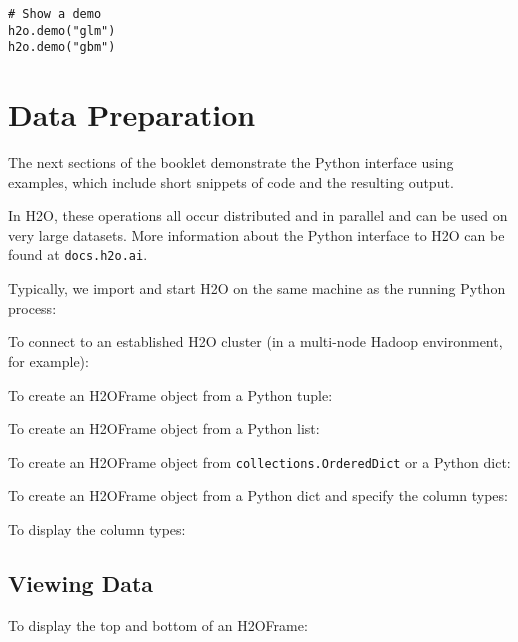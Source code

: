 {\begin{lstlisting}[style=python]
# Show a demo
h2o.demo("glm")
h2o.demo("gbm")
\end{lstlisting}


\section{Data Preparation}
The next sections of the booklet demonstrate the Python interface using examples, which include  short snippets of code and the
resulting output.  

In H2O, these operations all occur distributed and in
parallel and can be used on very large datasets.  More information about the
Python interface to H2O can be found at {\texttt{docs.h2o.ai}}.

Typically, we import and start H2O on the same machine as the running Python process:


To connect to an established H2O cluster (in a multi-node Hadoop environment, for example):


To create an H2OFrame object from a Python tuple:


To create an H2OFrame object from a Python list:


\newpage

To create an H2OFrame object from  \texttt{collections.OrderedDict} or a Python dict:


To create an H2OFrame object from a Python dict and specify the column types:


To display the column types:


\newpage

\subsection{Viewing Data}
To display the top and bottom of an H2OFrame:



}
